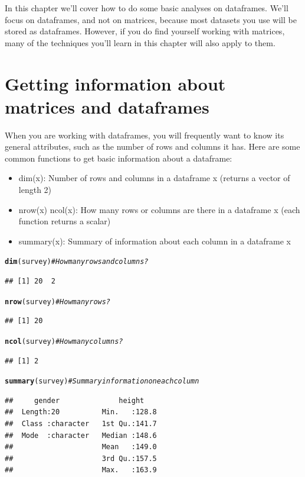 \documentclass{tufte-book}\usepackage[]{graphicx}\usepackage[]{color}
\makeatletter
\newcommand{\hlcom}[1]{\textcolor[rgb]{0.678,0.584,0.686}{\textit{#1}}}%
\newcommand{\hlstd}[1]{\textcolor[rgb]{0.345,0.345,0.345}{#1}}%
\newcommand{\hlkwd}[1]{\textcolor[rgb]{0.737,0.353,0.396}{\textbf{#1}}}%
\newenvironment{kframe}{%
 \def\at@end@of@kframe{}%
 \ifinner\ifhmode%
  \def\at@end@of@kframe{\end{minipage}}%
  \begin{minipage}{\columnwidth}%
 \fi\fi%
 \def\FrameCommand##1{\hskip\@totalleftmargin \hskip-\fboxsep
 \colorbox{shadecolor}{##1}\hskip-\fboxsep
     \hskip-\linewidth \hskip-\@totalleftmargin \hskip\columnwidth}%
 \MakeFramed {\advance\hsize-\width
   \@totalleftmargin\z@ \linewidth\hsize
   \@setminipage}}%
 {\par\unskip\endMakeFramed%
 \at@end@of@kframe}
\newenvironment{knitrout}{}{} %
\makeatother
\begin{document}
\begin{footnotesize}
In this chapter we'll cover how to do some basic analyses on dataframes. We'll focus on dataframes, and not on matrices, because most datasets you use will be stored as dataframes. However, if you do find yourself working with matrices, many of the techniques you'll learn in this chapter will also apply to them.


\section{Getting information about matrices and dataframes}

When you are working with dataframes, you will frequently want to know its general attributes, such as the number of rows and columns it has. Here are some common functions to get basic information about a dataframe:

\begin{itemize}
  \item dim(x): Number of rows and columns in a dataframe x (returns a vector of length 2)
  \item nrow(x) ncol(x): How many rows or columns are there in a dataframe x (each function returns a scalar)
  \item summary(x): Summary of information about each column in a dataframe x
\end{itemize}


\begin{footnotesize}
\begin{knitrout}
\color{fgcolor}\begin{kframe}
\begin{alltt}
\hlkwd{dim}\hlstd{(survey)} \hlcom{# How many rows and columns?}
\end{alltt}
\begin{verbatim}
## [1] 20  2
\end{verbatim}
\begin{alltt}
\hlkwd{nrow}\hlstd{(survey)} \hlcom{# How many rows?}
\end{alltt}
\begin{verbatim}
## [1] 20
\end{verbatim}
\begin{alltt}
\hlkwd{ncol}\hlstd{(survey)} \hlcom{# How many columns?}
\end{alltt}
\begin{verbatim}
## [1] 2
\end{verbatim}
\begin{alltt}
\hlkwd{summary}\hlstd{(survey)} \hlcom{# Summary information on each column}
\end{alltt}
\begin{verbatim}
##     gender              height     
##  Length:20          Min.   :128.8  
##  Class :character   1st Qu.:141.7  
##  Mode  :character   Median :148.6  
##                     Mean   :149.0  
##                     3rd Qu.:157.5  
##                     Max.   :163.9
\end{verbatim}
\end{kframe}
\end{knitrout}
\end{footnotesize}


\end{footnotesize}
\end{document}
